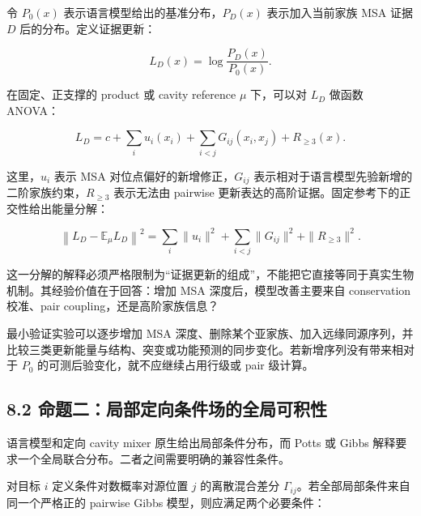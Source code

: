 \documentclass[10pt]{article}
\begin{document}

令 \(P_0(x)\) 表示语言模型给出的基准分布，\(P_D(x)\) 表示加入当前家族 MSA 证据 \(D\) 后的分布。定义证据更新：\par


\begin{equation}
L_D(x)=\log\frac{P_D(x)}{P_0(x)}.
\end{equation}

在固定、正支撑的 product 或 cavity reference \(\mu\) 下，可以对 \(L_D\) 做函数 ANOVA：\par


\begin{equation}
L_D=c+\sum_i u_i(x_i)
+\sum_{i<j}G_{ij}(x_i,x_j)+R_{\ge 3}(x).
\end{equation}

这里，\(u_i\) 表示 MSA 对位点偏好的新增修正，\(G_{ij}\) 表示相对于语言模型先验新增的二阶家族约束，\(R_{\ge 3}\) 表示无法由 pairwise 更新表达的高阶证据。固定参考下的正交性给出能量分解：\par


\begin{equation}
\left\|L_D-\mathbb E_\mu L_D\right\|^2
=\sum_i\|u_i\|^2
+\sum_{i<j}\|G_{ij}\|^2
+\|R_{\ge 3}\|^2.
\end{equation}

这一分解的解释必须严格限制为“证据更新的组成”，不能把它直接等同于真实生物机制。其经验价值在于回答：增加 MSA 深度后，模型改善主要来自 conservation 校准、pair coupling，还是高阶家族信息？\par

最小验证实验可以逐步增加 MSA 深度、删除某个亚家族、加入远缘同源序列，并比较三类更新能量与结构、突变或功能预测的同步变化。若新增序列没有带来相对于 \(P_0\) 的可测后验变化，就不应继续占用行级或 pair 级计算。\par

\subsection*{8.2 命题二：局部定向条件场的全局可积性}


语言模型和定向 cavity mixer 原生给出局部条件分布，而 Potts 或 Gibbs 解释要求一个全局联合分布。二者之间需要明确的兼容性条件。\par

对目标 \(i\) 定义条件对数概率对源位置 \(j\) 的离散混合差分 \(\Gamma_{ij}\)。若全部局部条件来自同一个严格正的 pairwise Gibbs 模型，则应满足两个必要条件：\par
\end{document}
